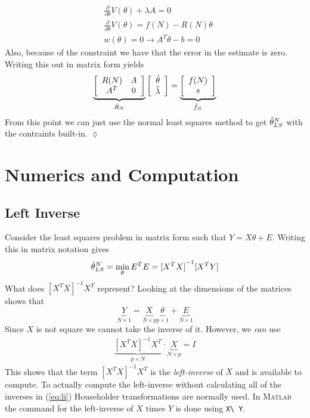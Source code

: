 \begin{example}
\begin{align*}
&\frac{\partial}{\partial\theta}V(\theta) +\lambda A = 0 \\
&\frac{\partial}{\partial\theta}V(\theta) = f(N)-R(N)\theta \\
&w(\theta)=0\rightarrow A^T\theta-b=0
\end{align*}
Also, because of the constraint we have that the error in the estimate is zero.
Writing this out in matrix form yields
\begin{align*}
\underbrace{\left[\begin{array}{c c} R(N) & A \\ A^T & 0 \end{array}\right]}_{\tilde{R}_N} \left[\begin{array}{c} \hat{\theta} \\ \hat{\lambda} \end{array}\right] = \underbrace{\left[\begin{array}{c} f(N) \\ s \end{array}\right]}_{\tilde{f}_N}
\end{align*}
From this point we can just use the normal least squares method to get $\hat{\theta}_{LS}^N$ with the contraints built-in.
$\lozenge$
\end{example}

\section{Numerics and Computation}
\subsection{Left Inverse}
Consider the least squares problem in matrix form such that $Y=X\theta+E$.
Writing this in matrix notation gives
$$\hat{\theta}_{LS}^N = \min_\theta E^T E = {[X^T X]}^{-1}[X^T Y]$$
What does ${[X^T X]}^{-1}X^T$ represent? Looking at the dimensions of the matrices shows that
$$\underbrace{Y}_{N\times1} = \underbrace{X}_{N\times p} \underbrace{\theta}_{p\times1} + \underbrace{E}_{N\times1}$$
Since $X$ is not square we cannot take the inverse of it.
However, we \textit{can} use
\begin{align}
\label{eq:li}
\underbrace{{[X^T X]}^{-1}X^T}_{p\times N} \cdot \underbrace{X}_{N\times p} = I
\end{align}
This shows that the term ${[X^T X]}^{-1}X^T$ is the \textit{left-inverse} of $X$ and is available to compute.
To actually compute the left-inverse without calculating all of the inverses in (\ref{eq:li}) Householder transformations are normally used.
In \textsc{Matlab} the command for the left-inverse of $X$ times $Y$ is done using \texttt{X\textbackslash~Y}.

